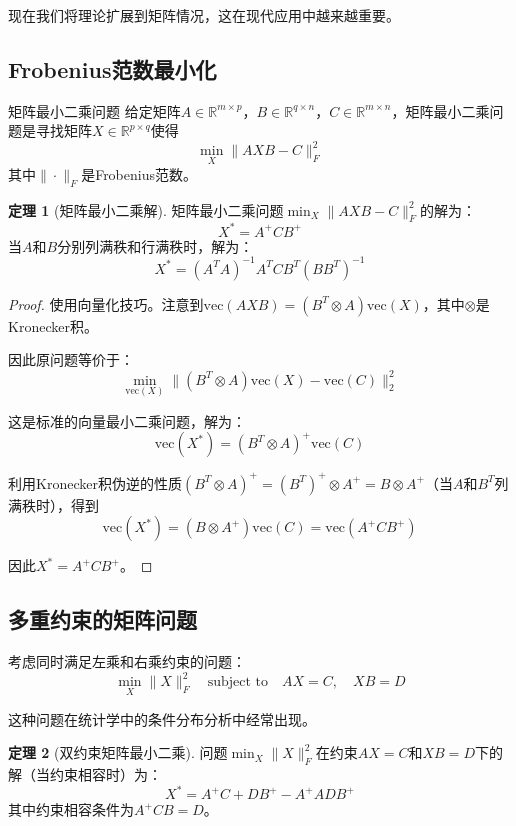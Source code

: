 \documentclass[11pt,a4paper]{ctexart}
\theoremstyle{definition}
\newtheorem{theorem}{定理}[section]
\newcommand{\RR}{\mathbb{R}}
\begin{document}
现在我们将理论扩展到矩阵情况，这在现代应用中越来越重要。

\subsection{Frobenius范数最小化}

\begin{importantdef}{矩阵最小二乘问题}
给定矩阵$A \in \RR^{m \times p}$，$B \in \RR^{q \times n}$，$C \in \RR^{m \times n}$，矩阵最小二乘问题是寻找矩阵$X \in \RR^{p \times q}$使得
$$\min_{X} \|AXB - C\|_F^2$$
其中$\|\cdot\|_F$是Frobenius范数。
\end{importantdef}

\begin{theorem}[矩阵最小二乘解]
矩阵最小二乘问题$\min_X \|AXB - C\|_F^2$的解为：
$$X^* = A^+CB^+$$
当$A$和$B$分别列满秩和行满秩时，解为：
$$X^* = (A^TA)^{-1}A^TC B^T(BB^T)^{-1}$$
\end{theorem}

\begin{proof}
使用向量化技巧。注意到$\text{vec}(AXB) = (B^T \otimes A)\text{vec}(X)$，其中$\otimes$是Kronecker积。

因此原问题等价于：
$$\min_{\text{vec}(X)} \|(B^T \otimes A)\text{vec}(X) - \text{vec}(C)\|_2^2$$

这是标准的向量最小二乘问题，解为：
$$\text{vec}(X^*) = (B^T \otimes A)^+\text{vec}(C)$$

利用Kronecker积伪逆的性质$(B^T \otimes A)^+ = (B^T)^+ \otimes A^+ = B \otimes A^+$（当$A$和$B^T$列满秩时），得到
$$\text{vec}(X^*) = (B \otimes A^+)\text{vec}(C) = \text{vec}(A^+CB^+)$$

因此$X^* = A^+CB^+$。
\end{proof}

\subsection{多重约束的矩阵问题}

考虑同时满足左乘和右乘约束的问题：
$$\min_X \|X\|_F^2 \quad \text{subject to} \quad AX = C, \quad XB = D$$

这种问题在统计学中的条件分布分析中经常出现。

\begin{theorem}[双约束矩阵最小二乘]
问题$\min_X \|X\|_F^2$在约束$AX = C$和$XB = D$下的解（当约束相容时）为：
$$X^* = A^+C + D B^+ - A^+ADB^+$$
其中约束相容条件为$A^+CB = D$。
\end{theorem}
\end{document}

